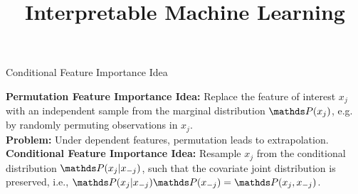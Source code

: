 \documentclass[11pt,compress,t,notes=noshow, aspectratio=169, xcolor=table]{beamer}
\title{Interpretable Machine Learning}
\date{}
\begin{document}
	\newcommand{\titlefigure}{figure_man/feature-importance.png}
    \newcommand{\learninggoals}{
    	\item Extrapolation and Conditional Sampling
    	\item Conditional Feature Importance (CFI)
    	\item Interpretation of CFI}
	
	
	
	
% 	
% 	
% 	
	
	


\begin{vbframe}{Conditional Feature Importance Idea}

\textbf{Permutation Feature Importance Idea:} Replace the feature of interest $x_j$ with an independent sample from the marginal distribution $\P(x_j)$, e.g. by randomly permuting observations in $x_j$.\\
\lz
\textbf{Problem:} Under dependent features, permutation leads to extrapolation.\\
\lz
\textbf{Conditional Feature Importance Idea:} Resample $x_j$ from the conditional distribution $\P(x_j|x_{-j})$, such that the covariate joint distribution is preserved, i.e., $\P(x_j|x_{-j}) \P(x_{-j}) = \P(x_j, x_{-j})$.

\end{vbframe}
\end{document}
